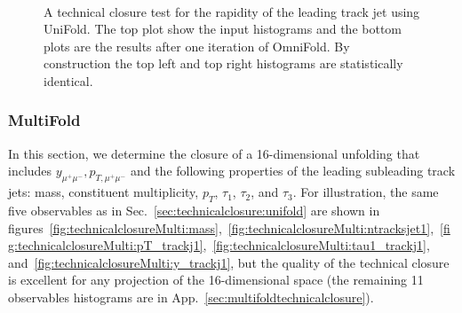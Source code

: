 \documentclass[NOTE, atlasdraft=true, texlive=2016, UKenglish]{\ATLASLATEXPATH atlasdoc}
\begin{document}
\begin{figure}[h!]
\centering
{}\\
\caption{A technical closure test for the rapidity of the leading track jet using UniFold.  The top plot show the input histograms and the bottom plots are the results after one iteration of OmniFold.  By construction the top left and top right histograms are statistically identical.}
\label{fig:technicalclosure:y_trackj1}
\end{figure}

\subsubsection{MultiFold}
\label{sec:technicalclosure:multifold}

In this section, we determine the closure of a 16-dimensional unfolding that includes $y_{\mu^+\mu^-},p_{T,\mu^+\mu^-}$ and the following properties of the leading subleading track jets: mass, constituent multiplicity, $p_T$, $\tau_1$, $\tau_2$, and $\tau_3$.  For illustration, the same five observables as in Sec.~\ref{sec:technicalclosure:unifold} are shown in figures~\ref{fig:technicalclosureMulti:mass},~\ref{fig:technicalclosureMulti:ntracksjet1},~\ref{fig:technicalclosureMulti:pT_trackj1},~\ref{fig:technicalclosureMulti:tau1_trackj1}, and~\ref{fig:technicalclosureMulti:y_trackj1}, but the quality of the technical closure is excellent for any projection of the 16-dimensional space (the remaining 11 observables histograms are in App.~\ref{sec:multifoldtechnicalclosure}).
\end{document}
